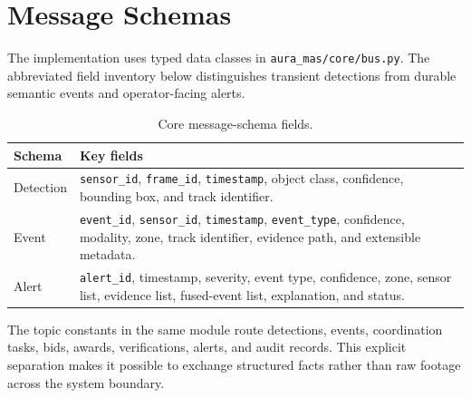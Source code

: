 \chapter{Message Schemas}
\label{app:schemas}

The implementation uses typed data classes in \texttt{aura\_mas/core/bus.py}.
The abbreviated field inventory below distinguishes transient detections from
durable semantic events and operator-facing alerts.

\begin{table}[H]
\centering
\small
\caption{Core message-schema fields.}\label{tab:schemas}
\begin{tabular}{p{2.3cm}p{9.5cm}}
\toprule
\textbf{Schema} & \textbf{Key fields} \\
\midrule
Detection & \texttt{sensor\_id}, \texttt{frame\_id}, \texttt{timestamp}, object class, confidence, bounding box, and track identifier. \\
Event & \texttt{event\_id}, \texttt{sensor\_id}, \texttt{timestamp}, \texttt{event\_type}, confidence, modality, zone, track identifier, evidence path, and extensible metadata. \\
Alert & \texttt{alert\_id}, timestamp, severity, event type, confidence, zone, sensor list, evidence list, fused-event list, explanation, and status. \\
\bottomrule
\end{tabular}
\end{table}

The topic constants in the same module route detections, events, coordination
tasks, bids, awards, verifications, alerts, and audit records. This explicit
separation makes it possible to exchange structured facts rather than raw
footage across the system boundary.
